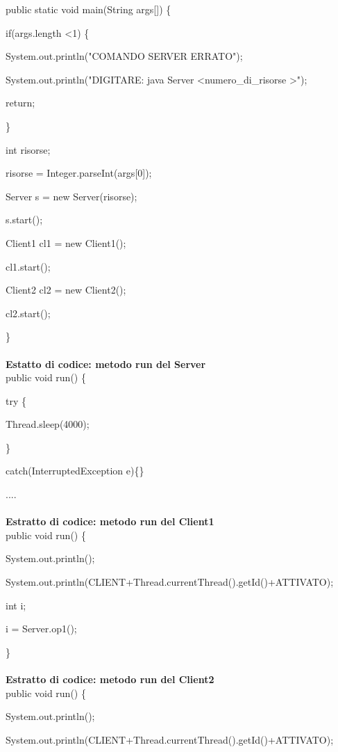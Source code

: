 \documentclass[10pt, a4paper]{article}
\begin{document}
public static void main(String args[]) \{

        if(args.length \textless 1) \{

            System.out.println("COMANDO SERVER ERRATO");

            System.out.println("DIGITARE: java Server \textless numero\_di\_risorse \textgreater");

            return;

        \}

        int risorse;

        risorse = Integer.parseInt(args[0]);

        Server s = new Server(risorse);

        s.start();

	Client1 cl1 = new Client1();

	cl1.start();

	Client2 cl2 = new Client2();

	cl2.start();

\}
\\\\
\textbf{Estatto di codice: metodo run del Server}
\\

public void run() \{

try \{ 

		Thread.sleep(4000);

	\}

	catch(InterruptedException e)\{\}

.... 
\\\\
\textbf{Estratto di codice: metodo run del Client1}
\\

public void run() \{

		System.out.println();

        	System.out.println(CLIENT+Thread.currentThread().getId()+ATTIVATO);

		int i;

		i = Server.op1();

\}
\\\\
\textbf{Estratto di codice: metodo run del Client2}
\\

public void run() \{

		System.out.println();

        	System.out.println(CLIENT+Thread.currentThread().getId()+ATTIVATO);
\end{document}
